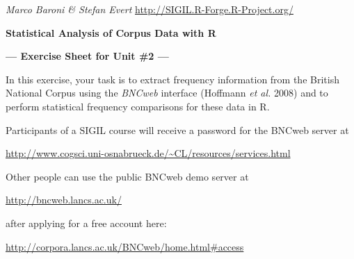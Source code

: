 \documentclass[a4paper,12pt]{article}
\begin{document}
\emph{Marco Baroni \& Stefan Evert} \hfill %
{\small \url{http://SIGIL.R-Forge.R-Project.org/}}

\begin{center}
  \textbf{\large Statistical Analysis of Corpus Data with R}

  \textbf{\large --- Exercise Sheet for Unit \#2 ---}
\end{center}


In this exercise, your task is to extract frequency information
from the British National Corpus using the \emph{BNCweb} interface (Hoffmann
\emph{et al.} 2008) and to perform statistical frequency comparisons for
these data in R.

Participants of a SIGIL course will receive a password for the BNCweb server
at
\begin{center}
  \url{http://www.cogsci.uni-osnabrueck.de/~CL/resources/services.html}
\end{center}
Other people can use the public BNCweb demo server at
\begin{center}
  \url{http://bncweb.lancs.ac.uk/}
\end{center}
after applying for a free account here:
\begin{center}
  \url{http://corpora.lancs.ac.uk/BNCweb/home.html#access}
\end{center}
\end{document}
